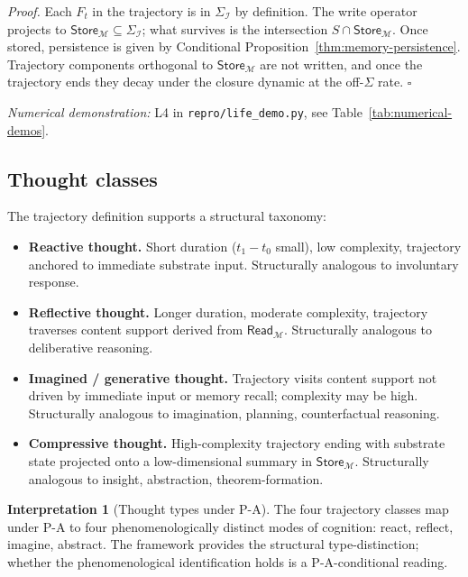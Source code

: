\documentclass[11pt]{article}
\theoremstyle{plain}
\theoremstyle{definition}
\newtheorem{interpretation}[theorem]{Interpretation}
\theoremstyle{remark}
\newcommand{\Ical}{\mathcal{I}}
\newcommand{\Mcal}{\mathcal{M}}
\begin{document}
\noindent\emph{Proof.} Each $F_t$ in the trajectory is in $\Sigma_\Ical$ by definition. The write operator projects to $\mathsf{Store}_\Mcal \subseteq \Sigma_\Ical$; what survives is the intersection $S \cap \mathsf{Store}_\Mcal$. Once stored, persistence is given by Conditional Proposition~\ref{thm:memory-persistence}. Trajectory components orthogonal to $\mathsf{Store}_\Mcal$ are not written, and once the trajectory ends they decay under the closure dynamic at the off-$\Sigma$ rate. \hfill$\square$

\noindent\emph{Numerical demonstration:} L4 in \texttt{repro/life\_demo.py}, see Table~\ref{tab:numerical-demos}.


\subsection{Thought classes}

The trajectory definition supports a structural taxonomy:

\begin{itemize}[leftmargin=2em]
\item \textbf{Reactive thought.} Short duration ($t_1 - t_0$ small), low complexity, trajectory anchored to immediate substrate input. Structurally analogous to involuntary response.
\item \textbf{Reflective thought.} Longer duration, moderate complexity, trajectory traverses content support derived from $\mathsf{Read}_\Mcal$. Structurally analogous to deliberative reasoning.
\item \textbf{Imagined / generative thought.} Trajectory visits content support not driven by immediate input or memory recall; complexity may be high. Structurally analogous to imagination, planning, counterfactual reasoning.
\item \textbf{Compressive thought.} High-complexity trajectory ending with substrate state projected onto a low-dimensional summary in $\mathsf{Store}_\Mcal$. Structurally analogous to insight, abstraction, theorem-formation.
\end{itemize}

\begin{interpretation}[Thought types under P-A]\label{int:thought-classes}
The four trajectory classes map under P-A to four phenomenologically distinct modes of cognition: react, reflect, imagine, abstract. The framework provides the structural type-distinction; whether the phenomenological identification holds is a P-A-conditional reading.
\end{interpretation}
\end{document}
